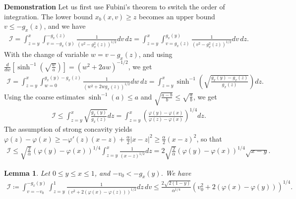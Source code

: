 \documentclass{article}
\newtheorem{lem}{Lemma}[section]
\numberwithin{equation}{section}
\newcommand{\myproof}[1]{
	\noindent \textbf{Demonstration}
	{\small	#1 \hfill \qedsymbol}
}
\begin{document}
\myproof{
	Let us first use Fubini's theorem to switch the order of integration. The lower bound $x_b(x,v) \geqslant z$ becomes an upper bound $v \leqslant -g_x(z)$, and we have
	\begin{align*}
		\mathcal{I} 
		= \int_{z=y}^{x} \int_{v = -g_x(y)}^{-g_x(z)} \frac{1}{\left(v^2-g_x^2(z)\right)^{1/2}} dv\,dz 
		= \int_{z=y}^{x} \int_{v = g_x(z)}^{g_x(y)} \frac{1}{\left(v^2-g_x^2(z)\right)^{1/2}} dv\,dz.
	\end{align*} 
	With the change of variable $w = v - g_x(z)$, and using $\frac{d}{dw} \left[\sinh^{-1}\left(\sqrt{\frac{w}{a}}\right)\right] = \left(w^2 + 2aw\right)^{-1/2}$, we get
	\begin{align*}
		\mathcal{I} 
		= \int_{z=y}^{x} \int_{w = 0}^{g_x(y)-g_x(z)} \frac{1}{\left(w^2 + 2 w g_x(z)\right)^{1/2}} dw\,dz
		= \int_{z=y}^{x} \sinh^{-1}\left(\sqrt{\frac{g_x(y) -g_x(z)}{g_x(z)}}\right) dz.
	\end{align*}
	Using the coarse estimates $\sinh^{-1}(a) \leqslant a$ and $\sqrt{\frac{a-b}{b}} \leqslant \sqrt{\frac{a}{b}}$, we get
	\begin{align*}
		\mathcal{I} \leqslant \int_{z=y}^{x} \sqrt{\frac{g_x(y)}{g_x(z)}} dz = \int_{z=y}^{x} \left(\frac{\varphi(y) - \varphi(x)}{\varphi(z) - \varphi(x)}\right)^{1/4} dz.
	\end{align*}
	The assumption of strong concavity yields $\varphi(z) - \varphi(x) \geqslant - \varphi'(z) (x - z) + \frac{\alpha}{2} |x - z|^2 \geqslant \frac{\alpha}{2} (x - z)^2$, so that 
	\begin{align*}
		\mathcal{I} 
		\leqslant \sqrt{\frac{2}{\alpha}}\left(\varphi(y) - \varphi(x)\right)^{1/4} \int_{z=y}^{x} \frac{1}{\left(x - z\right)^{1/2}} dz 
		= 2 \sqrt{\frac{2}{\alpha}}\left(\varphi(y) - \varphi(x)\right)^{1/4} \sqrt{x-y}.
	\end{align*}
}

\begin{lem}\label{lem:upperbound_ni_beginchar}
	Let $0 \leqslant y \leqslant x \leqslant 1$, and $-v_0 < -g_x(y)$. We have
	\begin{align*}
		\mathcal{I} \coloneqq \int_{v=-v_0}^{-g_x(y)} \int_{z=y}^{1} \frac{1}{\left(v^2 + 2 \left(\varphi(x) - \varphi(z)\right)\right)^{1/2}} dz \, dv \leqslant \frac{2\sqrt{2(1-y)}}{\alpha^{1/4}} \left(v_0^2 + 2 \left(\varphi(x) - \varphi(y)\right)\right)^{1/4}.
	\end{align*}
\end{lem}
\end{document}
